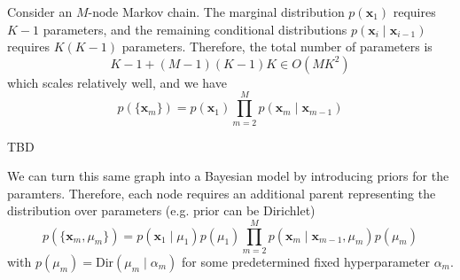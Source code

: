 \documentclass{article}
\begin{document}
  \begin{example}
    Consider an $M$-node Markov chain. The marginal distribution $p(\mathbf{x}_1)$ requires $K-1$ parameters, and the remaining conditional distributions $p(\mathbf{x}_i \mid \mathbf{x}_{i-1})$ requires $K(K-1)$ parameters. Therefore, the total number of parameters is 
    \begin{equation}
      K-1 + (M-1) (K-1) K \in O(M K^2)
    \end{equation}
    which scales relatively well, and we have 
    \begin{equation}
      p(\{\mathbf{x}_m\}) = p (\mathbf{x}_1) \prod_{m=2}^M p(\mathbf{x}_m \mid \mathbf{x}_{m-1})
    \end{equation}
    \begin{center}
      TBD
    \end{center}
    We can turn this same graph into a Bayesian model by introducing priors for the paramters. Therefore, each node requires an additional parent representing the distribution over parameters (e.g. prior can be Dirichlet)  
    \begin{equation}
      p(\{\mathbf{x}_m , \mu_m\}) = p(\mathbf{x}_1 \mid \mu_1) p(\mu_1) \prod_{m=2}^M p(\mathbf{x}_m \mid \mathbf{x}_{m-1}, \mu_m) p(\mu_m)
    \end{equation}
    with $p(\mu_m) = \mathrm{Dir}(\mu_m \mid \alpha_m)$ for some predetermined fixed hyperparameter $\alpha_m$. 

    \begin{figure}[H]
      \centering 
\end{figure}
\end{example}
\end{document}

